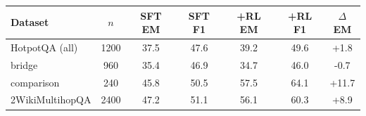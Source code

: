 \begin{tabular}{lcccccc}
\toprule
Dataset & $n$ & SFT EM & SFT F1 & +RL EM & +RL F1 & $\Delta$EM \\
\midrule
HotpotQA (all) & 1200 & 37.5 & 47.6 & 39.2 & 49.6 & +1.8 \\
\;\;bridge & 960 & 35.4 & 46.9 & 34.7 & 46.0 & -0.7 \\
\;\;comparison & 240 & 45.8 & 50.5 & 57.5 & 64.1 & +11.7 \\
2WikiMultihopQA & 2400 & 47.2 & 51.1 & 56.1 & 60.3 & +8.9 \\
\bottomrule
\end{tabular}
